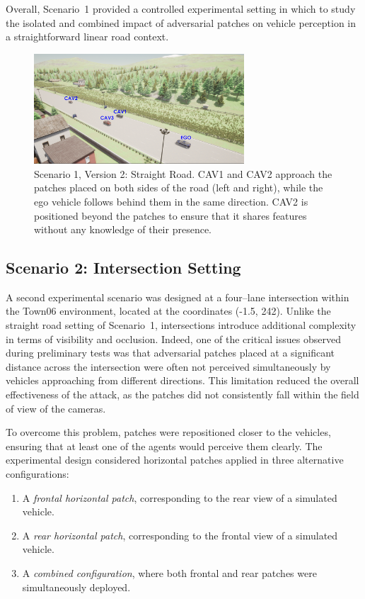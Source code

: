 Overall, Scenario~1 provided a controlled experimental setting in which to study the isolated and combined impact of adversarial patches on vehicle perception in a straightforward linear road context.

\begin{figure}[H]
    \centering
    \includegraphics[width=0.7\textwidth]{figures/experiments/scenario1_v2.png}
    \caption{Scenario 1, Version 2: Straight Road. CAV1 and CAV2 approach the patches placed on both sides of the road (left and right), while the ego vehicle follows behind them in the same direction. CAV2 is positioned beyond the patches to ensure that it shares features without any knowledge of their presence.}
    \label{fig:scenario_straight_road_v2}
\end{figure}

\subsection{Scenario 2: Intersection Setting}
\label{subsec:scenario2}

A second experimental scenario was designed at a four–lane intersection within the Town06 environment, located at the coordinates (-1.5, 242).
Unlike the straight road setting of Scenario~1, intersections introduce additional complexity in terms of visibility and occlusion. Indeed, one of the critical issues observed during preliminary tests was that adversarial patches placed at a significant distance across the intersection were often not perceived simultaneously by vehicles approaching from different directions. This limitation reduced the overall effectiveness of the attack, as the patches did not consistently fall within the field of view of the cameras.  

To overcome this problem, patches were repositioned closer to the vehicles, ensuring that at least one of the agents would perceive them clearly. The experimental design considered horizontal patches applied in three alternative configurations:  
\begin{enumerate}
    \item A \textit{frontal horizontal patch}, corresponding to the rear view of a simulated vehicle.  
    \item A \textit{rear horizontal patch}, corresponding to the frontal view of a simulated vehicle.  
    \item A \textit{combined configuration}, where both frontal and rear patches were simultaneously deployed.  
\end{enumerate}

